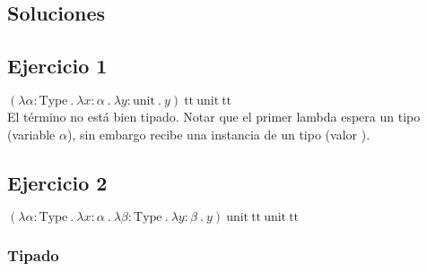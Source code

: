 \documentclass[a4paper]{article}
\newcommand{\Type}{\text{Type}}
\newcommand{\TT}{\text{tt}}
\newcommand{\Unit}{\text{unit}}
\begin{document}
\begin{landscape}


\newpage

\section{Soluciones}




\subsection{Ejercicio 1}

$(\lambda \alpha : \Type\ .\
  \lambda x : \alpha\ .\
  \lambda y : \Unit\ .\
  y)\
 \TT\ \Unit\ \TT$ \\

El término no está bien tipado. Notar que el primer lambda espera un tipo (variable $\alpha$), sin embargo recibe una instancia de un tipo (valor \TT).




\newpage

\subsection{Ejercicio 2}

$(\lambda \alpha : \Type\ .\
  \lambda x : \alpha\ .\
  \lambda \beta : \Type\ .\
  \lambda y : \beta\ .\
  y)\
 \Unit\ \TT\ \Unit\ \TT$ \\


\subsubsection{Tipado}


\end{landscape}
\end{document}
